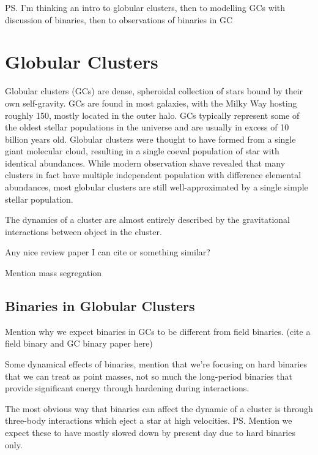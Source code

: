 








\ps{I'm thinking an intro to globular clusters, then to modelling GCs with discussion of binaries,
	then to observations of binaries in GC}

\section{Globular Clusters}

Globular clusters (GCs) are dense, spheroidal collection of stars bound by their own self-gravity.
GCs are found in most galaxies, with the Milky Way hosting roughly 150, mostly located in the outer
halo. GCs typically represent some of the oldest stellar populations in the universe and are usually
in excess of 10 billion years old. Globular clusters were thought to have formed from a single giant
molecular cloud, resulting in a single coeval population of star with identical abundances. While
modern observation shave revealed that many clusters in fact have multiple independent population
with difference elemental abundances, most globular clusters are still well-approximated by a single
simple stellar population.

The dynamics of a cluster are almost entirely described by the gravitational interactions between
object in the cluster.

Any nice review paper I can cite or something similar?

Mention mass segregation

\subsection{Binaries in Globular Clusters}

Mention why we expect binaries in GCs to be different from field binaries. (cite a field binary and GC binary paper here)

Some dynamical effects of binaries, mention that we're focusing on hard binaries that we can treat
as point masses, not so much the long-period binaries that provide significant energy through
hardening during interactions.

The most obvious way that binaries can affect the dynamic of a cluster is through three-body
interactions which eject a star at high velocities. \ps{Mention we expect these to have mostly
	slowed down by present day due to hard binaries only.}


